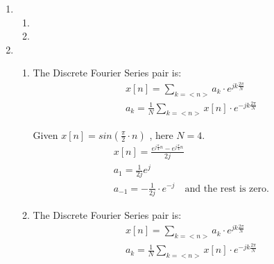 \documentclass[10pt,a4paper, margin=1in]{article}
\begin{document}
\begin{enumerate}
\item %
    \begin{enumerate}
    \item %
    \item %
    \end{enumerate}

\item %
    \begin{enumerate}
    \item %
    The Discrete Fourier Series pair is:
    \begin{align*}
        x[n] = \sum\limits_{k=<n>} a_{k} \cdot e^{j k\frac{2\pi}{N}} \\
        a_k = \frac{1}{N} \sum\limits_{k=<n>} x[n] \cdot e^{- j k\frac{2\pi}{N}}
    \end{align*}
    
    Given $ x[n] = sin(\frac{\pi}{2} \cdot n)  $ , here $N = 4$.
    \begin{align*}
        x[n] = \frac{ e^{j\frac{\pi}{4}n} - e^{j\frac{\pi}{4}n} }{ 2j } \\
        a_1 = \frac{1}{2j} e^{j} \\
        a_{-1} = - \frac{1}{2j} \cdot e^{-j} \quad \text{and the rest is zero.}
    \end{align*} 
    \item %
        The Discrete Fourier Series pair is:
    \begin{align*}
        x[n] = \sum\limits_{k=<n>} a_{k} \cdot e^{j k\frac{2\pi}{N}} \\
        a_k = \frac{1}{N} \sum\limits_{k=<n>} x[n] \cdot e^{- j k\frac{2\pi}{N}}
    \end{align*}
    

\end{enumerate}
\end{enumerate}
\end{document}
